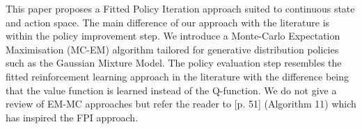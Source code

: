 \documentclass[final,5p,times,twocolumn]{elsarticle}
\begin{document}
This paper proposes a Fitted Policy Iteration approach suited to continuous state and action space. The main difference of our approach 
with the literature is within the policy improvement step. We introduce a Monte-Carlo Expectation Maximisation (MC-EM) 
algorithm tailored for generative distribution policies such as the Gaussian Mixture Model. The policy evaluation step resembles the 
fitted reinforcement learning approach in the literature with the difference being that the value function is learned instead of the Q-function.
We do not give a review of EM-MC approaches but refer the reader to \cite{p_search_surv_2011}[p. 51] (Algorithm 11) which has 
inspired the FPI approach.


\end{document}
